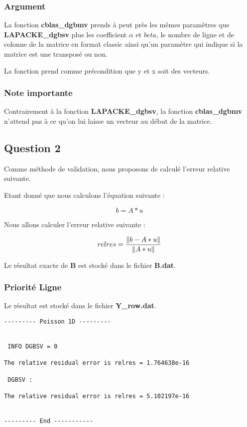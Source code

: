 \documentclass[11pt]{article}
\DeclarePairedDelimiter{\norm}{\lVert}{\rVert}
\begin{document}
\subsubsection{Argument}

La fonction \textbf{cblas\_dgbmv} prends à peut près les mêmes
paramètres que \textbf{LAPACKE\_dgbsv} plus les coefficient $\alpha$
et $beta$, le nombre de ligne et de colonne de la matrice en format
classic ainsi qu'un paramètre qui indique si la matrice est une
transposé ou non.\newline

La fonction prend comme précondition que y et x soit des vecteurs.

\subsubsection{Note importante}

Contrairement à la fonction \textbf{LAPACKE\_dgbsv}, la fonction
\textbf{cblas\_dgbmv} n'attend pas à ce qu'on lui laisse un vecteur au
début de la matrice.

\subsection{Question 2}

Comme méthode de validation, nous proposons de calculé l'erreur
relative suivante.\newline

Etant donné que nous calculons l'équation suivante :

\begin{equation*}
b = A * u
\end{equation*}

Nous allons calculer l'erreur relative suivante :

\begin{equation*}
relres = \frac{\norm{b - A * u}}{\norm{A * u}}
\end{equation*}

Le résultat exacte de \textbf{B} est stocké dans le fichier \textbf{B.dat}.

\subsubsection{Priorité Ligne}

Le résultat est stocké dans le fichier \textbf{Y\_row.dat}.\newline

\begin{lstlisting}
--------- Poisson 1D ---------


 INFO DGBSV = 0

The relative residual error is relres = 1.764638e-16

 DGBSV :

The relative residual error is relres = 5.102197e-16


--------- End -----------
\end{lstlisting}
\end{document}
